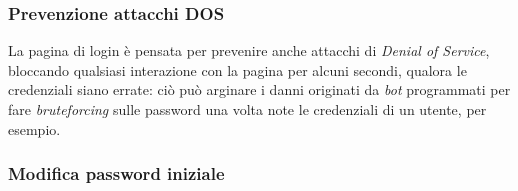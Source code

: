 \documentclass{article}
\begin{document}
\subsubsection{Prevenzione attacchi DOS}
La pagina di login è pensata per prevenire anche attacchi di \textit{Denial of Service}, bloccando qualsiasi interazione con la pagina per alcuni secondi, qualora le credenziali siano errate: ciò può arginare i danni originati da \textit{bot} programmati per fare \textit{bruteforcing} sulle password una volta note le credenziali di un utente, per esempio.
\subsubsection{Modifica password iniziale}
\end{document}
